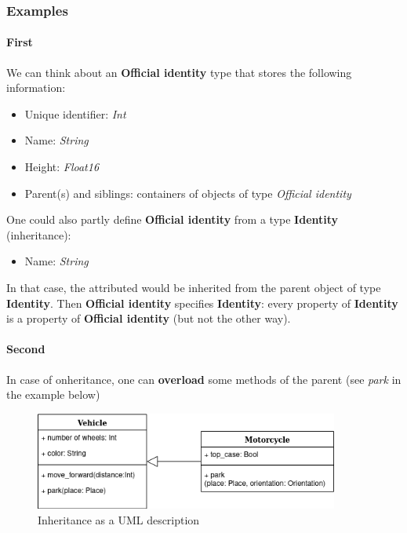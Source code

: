 \documentclass[11pt]{article}
\begin{document}
			\subsubsection{Examples}

				\paragraph{First}
					We can think about an \textbf{Official identity} type that stores the following information:
					\begin{itemize}
							\item Unique identifier: \textit{Int}
							\item Name: \textit{String}
							\item Height: \textit{Float16}
							\item Parent(s) and siblings: containers of objects of type \textit{Official identity}
					\end{itemize}
					One could also partly define \textbf{Official identity} from a type \textbf{Identity} (inheritance):
					\begin{itemize}
							\item Name: \textit{String}
					\end{itemize}
					In that case, the  attributed would be inherited from the parent object of type \textbf{Identity}. Then \textbf{Official identity} specifies 
                    \textbf{Identity}: every property of \textbf{Identity} is a property of \textbf{Official identity} (but not the other way).

				\paragraph{Second}
					In case of onheritance, one can \textbf{overload} some methods of the parent (see \textit{park} in the example below)
					\begin{figure}[h!]
							\centering
							\includegraphics[width=10cm]{figures/Heritage/Heritage.drawio.png}
							\caption{Inheritance as a UML description}
					\end{figure}
\end{document}
